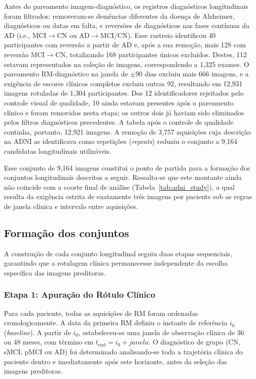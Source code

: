 \documentclass[review]{elsarticle}
\begin{document}
	Antes do pareamento imagem-diagnóstico, os registros diagnósticos longitudinais foram filtrados: removeram-se demências diferentes da doença de Alzheimer, diagnósticos ou datas em falta, e reversões de diagnósticos nas fases contínuas da AD (i.e., MCI$\rightarrow$CN ou AD$\rightarrow$MCI/CN). Esse rastreio identificou 40 participantes com reversão a partir de AD e, após a sua remoção, mais 128 com reversão MCI$\rightarrow$CN, totalizando 168 participantes únicos excluídos. Destes, 112 estavam representados na coleção de imagens, correspondendo a 1{,}325 exames. O pareamento RM-diagnóstico na janela de $\pm 90$ dias excluiu mais 666 imagens, e a exigência de escores clínicos completos excluiu outras 92, resultando em 12{,}931 imagens rotuladas de 1{,}304 participantes. Dos 12 identificadores rejeitados pelo controle visual de qualidade, 10 ainda estavam presentes após o pareamento clínico e foram removidos nesta etapa; os outros dois já haviam sido eliminados pelos filtros diagnósticos precedentes. A tabela após o controle de qualidade continha, portanto, 12{,}921 imagens. A remoção de 3{,}757 aquisições cuja descrição na ADNI as identificava como repetições (\emph{repeats}) reduziu o conjunto a 9{,}164 candidatas longitudinais utilizáveis. 
	
	Esse conjunto de 9{,}164 imagens constitui o ponto de partida para a formação dos conjuntos longitudinais descritos a seguir. Ressalta-se que este montante ainda não coincide com a coorte final de análise (Tabela~\ref{tab:adni_study}), a qual resulta da exigência estrita de exatamente três imagens por paciente sob as regras de janela clínica e intervalo entre aquisições.
	
	
	
	\subsection{Formação dos conjuntos}\label{subsec:formacao}
	
	A construção de cada conjunto longitudinal seguiu duas etapas sequenciais, garantindo que a rotulagem clínica permanecesse independente da escolha específica das imagens preditoras.
	
	\subsubsection{Etapa 1: Apuração do Rótulo Clínico}
	Para cada paciente, todas as aquisições de RM foram ordenadas cronologicamente. A data da primeira RM definiu o instante de referência $i_0$ (\textit{baseline}). A partir de $i_0$, estabeleceu-se uma janela de observação clínica de 36 ou 48 meses, com término em $t_{\mathrm{end}} = i_0 + janela$. O diagnóstico de grupo (CN, sMCI, pMCI ou AD) foi determinado analisando-se toda a trajetória clínica do paciente dentro e imediatamente após este horizonte, antes da seleção das imagens preditoras.
	
\end{document}
